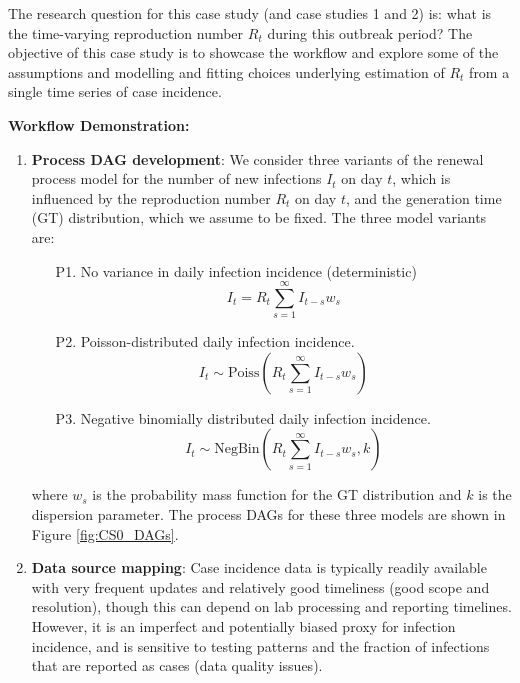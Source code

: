 \documentclass{article}
\begin{document}
The research question for this case study (and case studies 1 and 2) is: what is the time-varying reproduction number $R_t$ during this outbreak period?
The objective of this case study is to showcase the workflow and explore some of the assumptions and modelling and fitting choices underlying estimation of $R_t$ from a single time series of case incidence.



\textbf{Workflow Demonstration:}
\begin{enumerate}
    \item \textbf{Process DAG development}: We consider three variants of the renewal process model for the number of new infections $I_t$ on day $t$, which is influenced by the reproduction number $R_t$ on day $t$, and the generation time (GT) distribution, which we assume to be fixed. The three model variants are:
\begin{itemize}
    \item[P1.] No variance in daily infection incidence (deterministic)
    \begin{equation} \label{eq:infections_P1}
        I_t = R_t \sum_{s=1}^\infty I_{t-s}w_s 
    \end{equation}
    \item[P2.] Poisson-distributed daily infection incidence.
        \begin{equation} \label{eq:infections_P2}
        I_t \sim \mathrm{Poiss}\left( R_t \sum_{s=1}^\infty I_{t-s}w_s  \right)
    \end{equation}
    \item[P3.] Negative binomially distributed daily infection incidence. 
            \begin{equation} \label{eq:infections_P3}
        I_t \sim \mathrm{NegBin}\left( R_t \sum_{s=1}^\infty I_{t-s}w_s, k  \right)
    \end{equation}
\end{itemize}
where $w_s$ is the probability mass function for the GT distribution and $k$ is the dispersion parameter. 
The process DAGs for these three models are shown in Figure \ref{fig:CS0_DAGs}.

 

\item \textbf{Data source mapping}: Case incidence data is typically readily available with very frequent updates and relatively good timeliness (good scope and resolution), though this can depend on lab processing and reporting timelines. However, it is an imperfect and potentially biased proxy for infection incidence, and is sensitive to testing patterns and the fraction of infections that are reported as cases (data quality issues). 



\end{enumerate}
\end{document}
